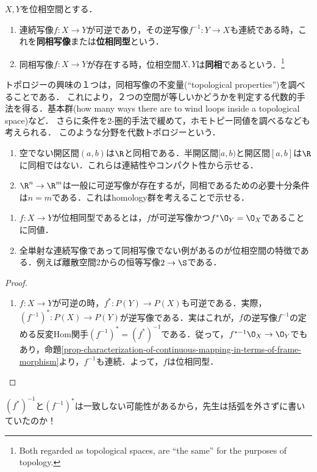 \documentclass[uplatex,dvipdfmx]{jsreport}
\begin{document}
\begin{definition}[homeomorphism]
    $X,Y$を位相空間とする．
    \begin{enumerate}
        \item 連続写像$f:X\to Y$が可逆であり，その逆写像$f^{-1}:Y\to X$も連続である時，これを\textbf{同相写像}または\textbf{位相同型}という．
        \item 同相写像$f:X\to Y$が存在する時，位相空間$X,Y$は\textbf{同相}であるという．\footnote{Both regarded as topological spaces, are “the same” for the purposes of topology.}
    \end{enumerate}
\end{definition}
\begin{remark}
    トポロジーの興味の１つは，同相写像の不変量(“topological properties”)を調べることである．
    これにより，２つの空間が等しいかどうかを判定する代数的手法を得る．基本群(how many ways there are to wind loops inside a topological space)など．
    さらに条件を2-圏的手法で緩めて，ホモトピー同値を調べるなども考えられる．
    このような分野を代数トポロジーという．
    \begin{enumerate}
        \item 空でない開区間$(a,b)$は$\R$と同相である．半開区間$[a,b)$と開区間$[a,b]$は$\R$に同相ではない．これらは連結性やコンパクト性から示せる．
        \item $\R^n\to\R^m$は一般に可逆写像が存在するが，同相であるための必要十分条件は$n=m$である．これはhomology群を考えることで示せる．
    \end{enumerate}
\end{remark}

\begin{lemma}[位相同型の特徴付け]\mbox{}\label{lemma-characterization-of-homeomorphism}
    \begin{enumerate}
        \item $f:X\to Y$が位相同型であるとは，$f$が可逆写像かつ$f^*\O_Y=\O_X$であることに同値．
        \item 全単射な連続写像であって同相写像でない例があるのが位相空間の特徴である．例えば離散空間$2$からの恒等写像$2\to\S$である．
    \end{enumerate}
\end{lemma}
\begin{proof}\mbox{}
    \begin{enumerate}
        \item $f:X\to Y$が可逆の時，$f^*:P(Y)\to P(X)$も可逆である．実際，$(f^{-1})^*:P(X)\to P(Y)$が逆写像である．実はこれが，$f$の逆写像$f^{-1}$の定める反変Hom関手$(f^{-1})^*=(f^*)^{-1}$である．従って，$f^{*-1}\O_X\to\O_Y$でもあり，命題\ref{prop-characterization-of-continuous-mapping-in-terms-of-frame-morphism}より，$f^{-1}$も連続．よって，$f$は位相同型．
    \end{enumerate}
\end{proof}
\begin{remark}
    $(f^*)^{-1}$と$(f^{-1})^*$は一致しない可能性があるから，先生は括弧を外さずに書いていたのか！
\end{remark}
\end{document}
